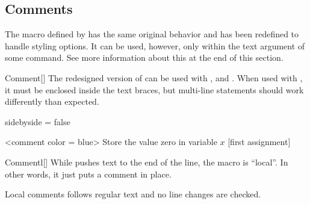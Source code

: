 \documentclass[a4paper, 11pt]{article}
\begin{document}
\subsection{Comments}\label{sec:comments}
The  macro defined by  has the same original behavior and has been redefined to handle styling options. It can be used, however, only within the text argument of some command. See more information about this at the end of this section.

\begin{macro}{Comment}[]
    The redesigned version of  can be used with ,  and . When used with , it must be enclosed inside the text braces, but multi-line statements should work differently than expected.

    \MacroOptionsText
\end{macro}

\begin{tcblisting}{sidebyside = false}
    \begin{minipage}{7.5cm}
        \begin{algorithmic}<comment color = blue>%
            \State Store the value zero in variable $x$
            [first assignment]%
        \end{algorithmic}
    \end{minipage}
\end{tcblisting}

\begin{macro}{Commentl}[]
    While  pushes text to the end of the line, the macro  is ``local''. In other words, it just puts a comment in place.

    Local comments follows regular text and no line changes are checked.

    \MacroOptionsText
\end{macro}

\begin{tcblisting}{}
    \begin{algorithmic}
        \EndIf
    \end{algorithmic}
\end{tcblisting}
\end{document}
